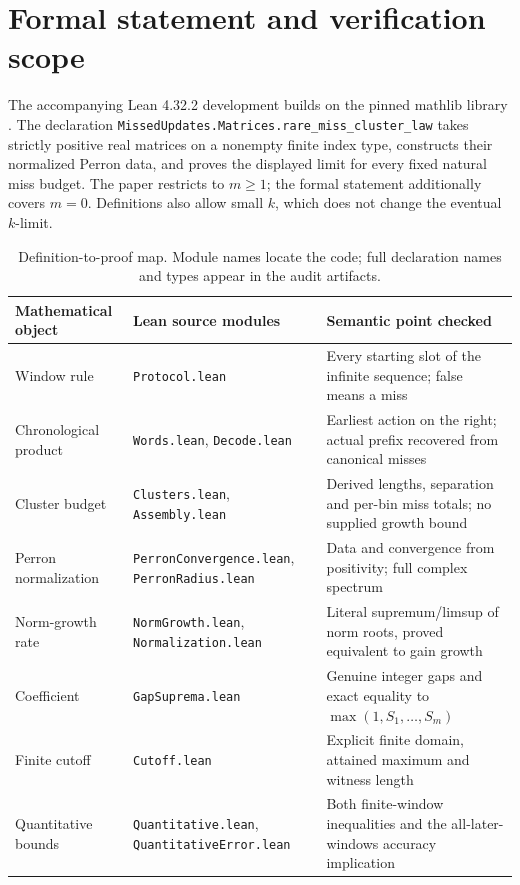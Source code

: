 \documentclass[11pt,letterpaper]{article}
\theoremstyle{remark}
\begin{document}
\section{Formal statement and verification scope}\label{sec:formal}

The accompanying Lean 4.32.2 development builds on the pinned mathlib
library \cite{mathlib2020}. The declaration
\texttt{MissedUpdates.Matrices.rare\_miss\_cluster\_law}
takes strictly positive real matrices on a nonempty finite index type,
constructs their normalized Perron data, and proves the displayed limit
for every fixed natural miss budget. The paper restricts to $m\ge1$;
the formal statement additionally covers $m=0$. Definitions also allow
small $k$, which does not change the eventual $k$-limit.

\begin{table}[tb]
\centering\small
\renewcommand{\arraystretch}{1.15}
\begin{tabular}{@{}>{\raggedright\arraybackslash}p{.22\linewidth}
 >{\raggedright\arraybackslash}p{.31\linewidth}
 >{\raggedright\arraybackslash}p{.37\linewidth}@{}}
Mathematical object & Lean source modules & Semantic point checked\\\hline
Window rule & \texttt{Protocol.lean} & Every starting slot of the infinite sequence; false means a miss\\
Chronological product & \texttt{Words.lean}, \texttt{Decode.lean} & Earliest action on the right; actual prefix recovered from canonical misses\\
Cluster budget & \texttt{Clusters.lean}, \texttt{Assembly.lean} & Derived lengths, separation and per-bin miss totals; no supplied growth bound\\
Perron normalization & \texttt{PerronConvergence.lean}, \texttt{PerronRadius.lean} & Data and convergence from positivity; full complex spectrum\\
Norm-growth rate & \texttt{NormGrowth.lean}, \texttt{Normalization.lean} & Literal supremum/limsup of norm roots, proved equivalent to gain growth\\
Coefficient & \texttt{GapSuprema.lean} & Genuine integer gaps and exact equality to $\max(1,S_1,\ldots,S_m)$\\
Finite cutoff & \texttt{Cutoff.lean} & Explicit finite domain, attained maximum and witness length\\
Quantitative bounds & \texttt{Quantitative.lean}, \texttt{QuantitativeError.lean} & Both finite-window inequalities and the all-later-windows accuracy implication\\
\end{tabular}
\caption{Definition-to-proof map. Module names locate the code; full declaration
names and types appear in the audit artifacts.}\label{tab:formal}
\end{table}
\end{document}
